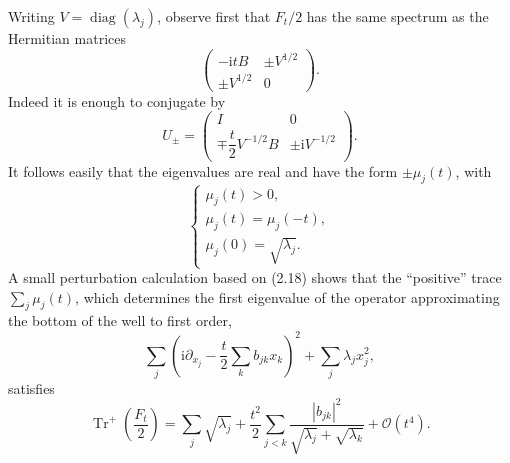 \documentclass[11pt]{article}
\newcommand{\Trp}{\operatorname{Tr}^{+}}
\newcommand{\diag}{\operatorname{diag}}
\newcommand{\OO}{\mathcal O}
\newcommand{\ii}{\mathrm{i}}
\begin{document}
Writing $V=\diag(\lambda_j)$, observe first that $F_t/2$ has the same spectrum as the Hermitian matrices
\begin{equation}
\begin{pmatrix}
-\ii tB & \pm V^{1/2}\\
\pm V^{1/2} & 0
\end{pmatrix}.
\tag{2.18}
\end{equation}
Indeed it is enough to conjugate by
\[
U_\pm=
\begin{pmatrix}
I&0\\[0.5ex]
\mp\dfrac{t}{2}V^{-1/2}B&\pm\ii V^{-1/2}
\end{pmatrix}.
\]
It follows easily that the eigenvalues are real and have the form $\pm\mu_j(t)$, with
\begin{equation}
\begin{cases}
\mu_j(t)>0,\\
\mu_j(t)=\mu_j(-t),\\
\mu_j(0)=\sqrt{\lambda_j}.
\end{cases}
\tag{2.19}
\end{equation}
A small perturbation calculation based on (2.18) shows that the ``positive'' trace $\sum_j\mu_j(t)$, which determines the first eigenvalue of the operator approximating the bottom of the well to first order,
\[
\sum_j\left(\ii\partial_{x_j}-\frac t2\sum_kb_{jk}x_k\right)^2
+\sum_j\lambda_jx_j^2,
\]
satisfies
\begin{equation}
\Trp\!\left(\frac{F_t}{2}\right)
=\sum_j\sqrt{\lambda_j}
+\frac{t^2}{2}\sum_{j<k}
\frac{|b_{jk}|^2}{\sqrt{\lambda_j}+\sqrt{\lambda_k}}
+\OO(t^4).
\tag{2.20}
\end{equation}
\end{document}
